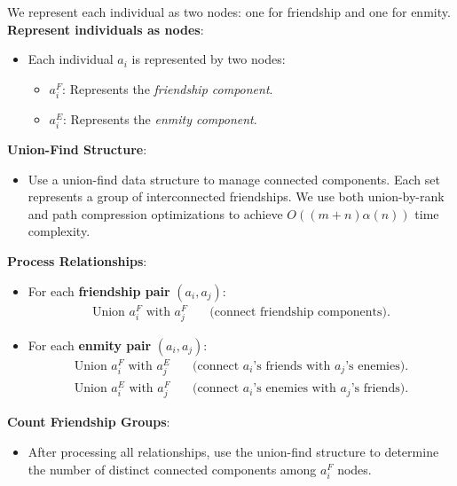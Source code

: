 \raggedright
\begin{solution}
    We represent each individual as two nodes: one for friendship and one for enmity.\\
    \textbf{Represent individuals as nodes}:
       \begin{itemize}
           \item Each individual $a_i$ is represented by two nodes:
                 \begin{itemize}
                     \item $a_i^F$: Represents the \textit{friendship component}.
                     \item $a_i^E$: Represents the \textit{enmity component}.
                 \end{itemize}
       \end{itemize}
    
    \textbf{Union-Find Structure}:
       \begin{itemize}
           \item Use a union-find data structure to manage connected components. Each set represents a group of interconnected friendships. We use both union-by-rank and path compression optimizations to achieve $O((m+n)\alpha(n))$ time complexity.
       \end{itemize}
    
    \textbf{Process Relationships}:
       \begin{itemize}
           \item For each \textbf{friendship pair} $(a_i, a_j)$:
                 \begin{align*}
                     \text{Union } a_i^F \text{ with } a_j^F \quad &\text{(connect friendship components)}.
                 \end{align*}
           \item For each \textbf{enmity pair} $(a_i, a_j)$:
                 \begin{align*}
                     \text{Union } a_i^F \text{ with } a_j^E \quad &\text{(connect $a_i$'s friends with $a_j$'s enemies)}. \\
                     \text{Union } a_i^E \text{ with } a_j^F \quad &\text{(connect $a_i$'s enemies with $a_j$'s friends)}.
                 \end{align*}
       \end{itemize}
    
    \textbf{Count Friendship Groups}:
       \begin{itemize}
           \item After processing all relationships, use the union-find structure to determine the number of distinct connected components among $a_i^F$ nodes.
       \end{itemize}
\end{solution}